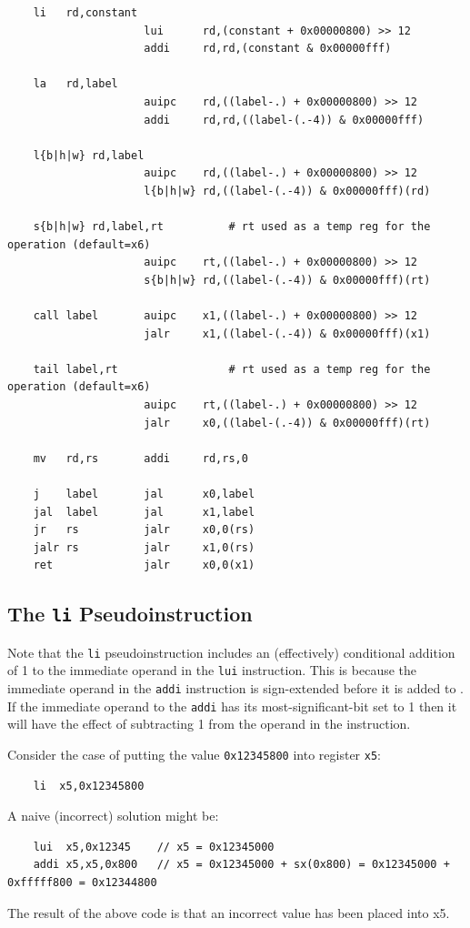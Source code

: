 {\small
\begin{verbatim}
    li   rd,constant
                     lui      rd,(constant + 0x00000800) >> 12
                     addi     rd,rd,(constant & 0x00000fff)

    la   rd,label
                     auipc    rd,((label-.) + 0x00000800) >> 12
                     addi     rd,rd,((label-(.-4)) & 0x00000fff)

    l{b|h|w} rd,label
                     auipc    rd,((label-.) + 0x00000800) >> 12
                     l{b|h|w} rd,((label-(.-4)) & 0x00000fff)(rd)

    s{b|h|w} rd,label,rt          # rt used as a temp reg for the operation (default=x6)
                     auipc    rt,((label-.) + 0x00000800) >> 12
                     s{b|h|w} rd,((label-(.-4)) & 0x00000fff)(rt)

    call label       auipc    x1,((label-.) + 0x00000800) >> 12
                     jalr     x1,((label-(.-4)) & 0x00000fff)(x1)

    tail label,rt                 # rt used as a temp reg for the operation (default=x6)
                     auipc    rt,((label-.) + 0x00000800) >> 12
                     jalr     x0,((label-(.-4)) & 0x00000fff)(rt)

    mv   rd,rs       addi     rd,rs,0

    j    label       jal      x0,label
    jal  label       jal      x1,label
    jr   rs          jalr     x0,0(rs)
    jalr rs          jalr     x1,0(rs)
    ret              jalr     x0,0(x1)
\end{verbatim}
}

\subsection{The \texttt{li} Pseudoinstruction}

Note that the \texttt{li} pseudoinstruction includes an (effectively) conditional addition
of 1 to the immediate operand
in the \texttt{lui} instruction.  This is because the immediate operand in the
\texttt{addi} instruction is sign-extended before it is added to \verb@rd@.
If the immediate operand to the \texttt{addi} has its most-significant-bit set to 1 then
it will have the effect of subtracting 1 from the operand in the \verb@lui@ instruction.

Consider the case of putting the value \texttt{0x12345800} into register \texttt{x5}:

{\small
\begin{verbatim}
    li  x5,0x12345800
\end{verbatim}
}
{\color{red}
A naive (incorrect) solution might be:
{\small
\begin{verbatim}
    lui  x5,0x12345    // x5 = 0x12345000
    addi x5,x5,0x800   // x5 = 0x12345000 + sx(0x800) = 0x12345000 + 0xfffff800 = 0x12344800
\end{verbatim}
}
The result of the above code is that an incorrect value has been placed into x5.
}

